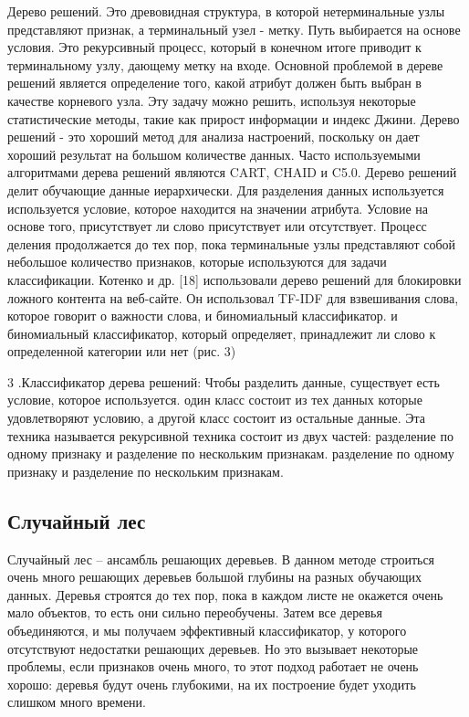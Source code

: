 Дерево решений. Это древовидная структура, в которой нетерминальные узлы
представляют признак, а терминальный узел - метку. Путь выбирается на основе
условия. Это рекурсивный процесс, который в конечном итоге приводит к
терминальному узлу, дающему метку на входе.
Основной проблемой в дереве решений является определение того, какой атрибут
должен быть выбран в качестве корневого узла. Эту задачу можно решить, используя
некоторые статистические методы, такие как прирост информации и индекс Джини.
Дерево решений - это хороший метод для анализа настроений, поскольку он дает
хороший результат на большом количестве данных. Часто используемыми алгоритмами
дерева решений являются CART, CHAID и C5.0. Дерево решений делит обучающие
данные иерархически. Для разделения данных используется используется условие,
которое находится на значении атрибута. Условие на основе того, присутствует ли
слово присутствует или отсутствует. Процесс деления продолжается до тех пор,
пока терминальные узлы представляют собой небольшое количество признаков,
которые используются для задачи классификации. Котенко и др. [18] использовали
дерево решений для блокировки ложного контента на веб-сайте. Он использовал
TF-IDF для взвешивания слова, которое говорит о важности слова, и биномиальный
классификатор. и биномиальный классификатор, который определяет, принадлежит ли
слово к определенной категории или нет (рис. 3) \cite{article16}

3 .Классификатор дерева решений: Чтобы разделить данные, существует есть
условие, которое используется. один класс состоит из тех данных которые
удовлетворяют условию, а другой класс состоит из остальные данные. Эта техника
называется рекурсивной техника состоит из двух частей: разделение по одному
признаку и разделение по нескольким признакам. разделение по одному признаку и
разделение по нескольким признакам. \cite{article18}

\subsection{Случайный лес}

Случайный лес – ансамбль решающих деревьев. В данном методе строиться очень
много решающих деревьев большой глубины на разных обучающих данных. Деревья
строятся до тех пор, пока в каждом листе не окажется очень мало объектов, то
есть они сильно переобучены.  Затем все деревья объединяются, и мы получаем
эффективный классификатор, у которого отсутствуют недостатки решающих деревьев.
Но это вызывает некоторые проблемы, если признаков очень много, то этот подход
работает не очень хорошо: деревья будут очень глубокими, на их построение будет
уходить слишком много времени. \cite{article9}

